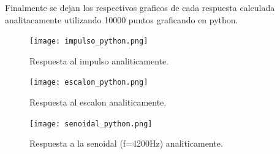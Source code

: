 \documentclass[11pt]{diazessay} %
\begin{document}
\newpage
Finalmente se dejan los respectivos graficos de cada respuesta calculada analitacamente utilizando 10000 puntos graficando en python.

\begin{figure}[h]
	\centering
	\texttt{[image: impulso\_python.png]}
\caption{Respuesta al impulso analiticamente.}
\end{figure}

\begin{figure}[h]
	\centering
	\texttt{[image: escalon\_python.png]}
\caption{Respuesta al escalon analiticamente.}
\end{figure}
\newpage
\begin{figure}[h]
	\centering
	\texttt{[image: senoidal\_python.png]}
\caption{Respuesta a la senoidal (f=4200Hz) analiticamente.}
\end{figure}

\end{document}
